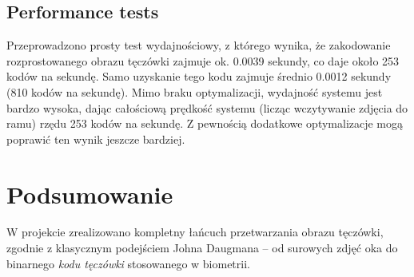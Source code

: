 \documentclass[a4paper]{article}
\begin{document}
\subsection*{Performance tests}

Przeprowadzono prosty test wydajnościowy, z którego wynika, że zakodowanie rozprostowanego obrazu tęczówki zajmuje ok. 0.0039 sekundy, co daje około 253 kodów na sekundę. Samo uzyskanie tego kodu zajmuje średnio 0.0012 sekundy (810 kodów na sekundę). Mimo braku optymalizacji, wydajność systemu jest bardzo wysoka, dając całościową prędkość systemu (licząc wczytywanie zdjęcia do ramu) rzędu 253 kodów na sekundę. Z pewnością dodatkowe optymalizacje mogą poprawić ten wynik jeszcze bardziej.

\section{Podsumowanie}

W projekcie zrealizowano kompletny łańcuch przetwarzania obrazu tęczówki, zgodnie z klasycznym podejściem Johna Daugmana – od surowych zdjęć oka do binarnego \textit{kodu tęczówki} stosowanego w biometrii.
\end{document}
